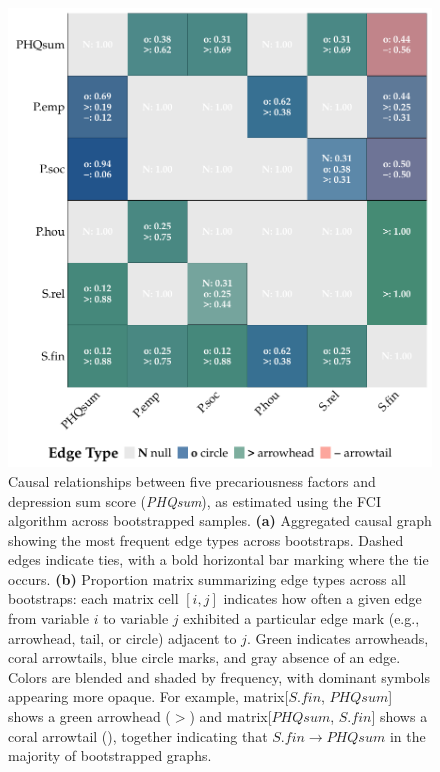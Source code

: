 \documentclass[
]{article}
\begin{document}
\begin{figure}
\begin{minipage}{0.50\linewidth}
{\includegraphics[width=1\textwidth,height=\textheight]{img/depsum_mat_fci.pdf}

}


\end{minipage}%

\caption{\label{fig-sum}Causal relationships between five precariousness
factors and depression sum score (\emph{PHQsum}), as estimated using the
FCI algorithm across bootstrapped samples. \textbf{(a)} Aggregated
causal graph showing the most frequent edge types across bootstraps.
Dashed edges indicate ties, with a bold horizontal bar marking where the
tie occurs. \textbf{(b)} Proportion matrix summarizing edge types across
all bootstraps: each matrix cell \([i, j]\) indicates how often a given
edge from variable \(i\) to variable \(j\) exhibited a particular edge
mark (e.g., arrowhead, tail, or circle) adjacent to \(j\). Green
indicates arrowheads, coral arrowtails, blue circle marks, and gray
absence of an edge. Colors are blended and shaded by frequency, with
dominant symbols appearing more opaque. For example,
matrix{[}\(\mathit{S.fin}\), \(\mathit{PHQsum}\){]} shows a green
arrowhead (\(>\)) and matrix{[}\(\mathit{PHQsum}\),
\(\mathit{S.fin}\){]} shows a coral arrowtail (\textemdash), together
indicating that \(\mathit{S.fin} \rightarrow \mathit{PHQsum}\) in the
majority of bootstrapped graphs.}

\end{figure}%
\end{document}
